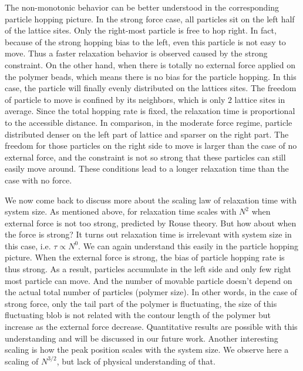 \documentclass[aps,showpacs,twocolumn,floatfix,prx,superscriptaddress]{revtex4-1}
\begin{document}
The non-monotonic behavior can be better understood in the corresponding
particle hopping picture. In the strong force case, all particles sit on the
left half of the lattice sites. Only the right-most particle is free to hop
right. In fact, because of the strong hopping bias to the left, even this
particle is not easy to move. Thus a faster relaxation behavior is observed
caused by the strong constraint. On the other hand, when there is totally no
external force applied on the polymer beads, which means there is no bias for
the particle hopping. In this case, the particle will finally evenly
distributed on the lattices sites. The freedom of particle to move is confined
by its neighbors, which is only $2$ lattice sites in average. Since the total
hopping rate is fixed, the relaxation time is proportional to the accessible
distance. In comparison, in the moderate force regime, particle distributed
denser on the left part of lattice and sparser on the right part. The freedom
for those particles on the right side to move is larger than the case of no
external force, and the constraint is not so strong that these particles can
still easily move around. These conditions lead to a longer relaxation time than
the case with no force. 

We now come back to discuss more about the scaling law of relaxation time with
system size. As mentioned above, for relaxation time scales with $N^2$ when
external force is not too strong, predicted by Rouse theory. But how about when
the force is strong? It turns out relaxation time is irrelevant with system size
in this case, i.e. $\tau \propto N^0$. We can again understand this easily
in the particle hopping picture. When the external force is strong, the bias of
particle hopping rate is thus strong. As a result, particles accumulate in the
left side and only few right most particle can move. And the number of movable
particle doesn't depend on the actual total number of particles (polymer size).
In other words, in the case of strong force, only the tail part of the polymer is
fluctuating, the size of this fluctuating blob is not related with the contour
length of the polymer but increase as the external force decrease. Quantitative
results are possible with this understanding and will be discussed in our
future work. Another interesting scaling is how the peak position scales with
the system size. We observe here a scaling of $N^{3/2}$, but lack of physical
understanding of that.
\end{document}
